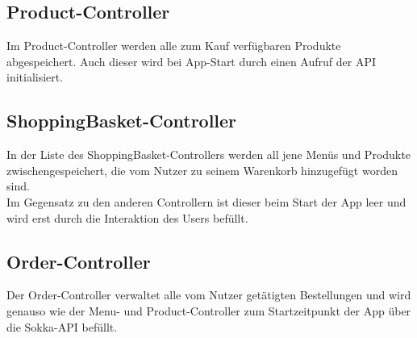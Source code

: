 \subsection{Product-Controller}

Im Product-Controller werden alle zum Kauf verfügbaren Produkte abgespeichert. Auch dieser wird
bei App-Start durch einen Aufruf der API initialisiert.

\subsection{ShoppingBasket-Controller}
\label{basketcontroller}

In der Liste des ShoppingBasket-Controllers werden all jene Menüs und Produkte zwischengespeichert, die 
vom Nutzer zu seinem Warenkorb hinzugefügt worden sind.\\
Im Gegensatz zu den anderen Controllern ist dieser beim Start der App leer und wird erst durch
die Interaktion des Users befüllt.

\subsection{Order-Controller}

Der Order-Controller verwaltet alle vom Nutzer getätigten Bestellungen und wird genauso wie der
Menu- und Product-Controller zum Startzeitpunkt der App über die Sokka-API befüllt.